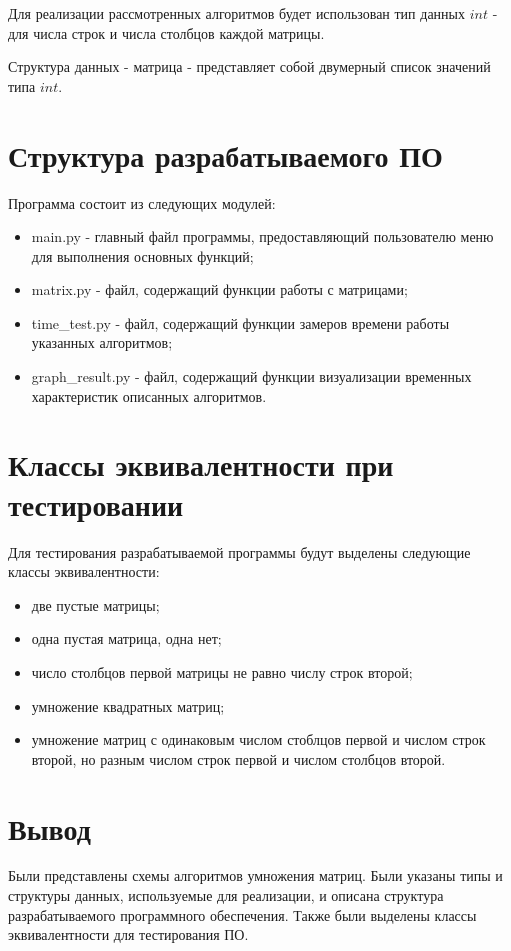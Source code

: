 Для реализации рассмотренных алгоритмов будет использован тип данных $int$ - для числа строк и числа столбцов каждой матрицы.

Структура данных - матрица - представляет собой двумерный список значений типа $int$.

\section{Структура разрабатываемого ПО}

Программа состоит из следующих модулей:

\begin{itemize}
	\item main.py - главный файл программы, предоставляющий пользователю меню для выполнения основных функций;
	\item matrix.py - файл, содержащий функции работы с матрицами;
	\item time\_test.py - файл, содержащий функции замеров времени работы указанных алгоритмов;
	\item graph\_result.py - файл, содержащий функции визуализации временных характеристик описанных алгоритмов.
\end{itemize}

\section{Классы эквивалентности при тестировании}

Для тестирования разрабатываемой программы будут выделены следующие классы эквивалентности:

\begin{itemize}
	\item две пустые матрицы;
	\item одна пустая матрица, одна нет;
	\item число столбцов первой матрицы не равно числу строк второй;
	\item умножение квадратных матриц;
	\item умножение матриц с одинаковым числом стоблцов первой и числом строк второй, но разным числом строк первой и числом столбцов второй.
\end{itemize}

\section{Вывод}

Были представлены схемы алгоритмов умножения матриц. Были указаны типы и структуры данных, используемые для реализации, и описана структура разрабатываемого программного обеспечения. Также были выделены классы эквивалентности для тестирования ПО.
